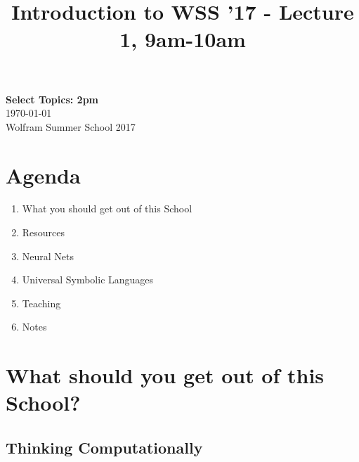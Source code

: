 \documentclass[11pt]{article}
\theoremstyle{definition}
\begin{document}
\title{Introduction to WSS '17 - Lecture 1, 9am-10am}

\thispagestyle{empty}
\begin{center}
{\LARGE \bf Select Topics: 2pm}\\
\medskip
{\Large \today}\\
\smallskip
{\large Wolfram Summer School 2017}
\end{center}





\section*{Agenda}
\begin{enumerate}
\item What you should get out of this School
\item Resources
\item Neural Nets
\item Universal Symbolic Languages
\item Teaching
\item Notes
\end{enumerate}

\noindent\hrulefill




\section{What should you get out of this School?}

\subsection{Thinking Computationally}
\end{document}
